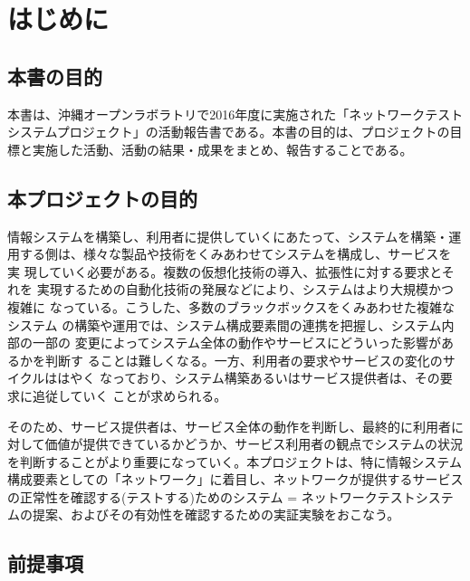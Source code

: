 
\chapter{はじめに}
\label{chap:abstract}

 \section{本書の目的}
 \label{sec:book-purpose}

本書は、沖縄オープンラボラトリで2016年度に実施された「ネットワークテスト
システムプロジェクト」の活動報告書である。本書の目的は、プロジェクトの目
標と実施した活動、活動の結果・成果をまとめ、報告することである。

 \section{本プロジェクトの目的}
 \label{sec:pj-purpose}


情報システムを構築し、利用者に提供していくにあたって、システムを構築・運
用する側は、様々な製品や技術をくみあわせてシステムを構成し、サービスを実
現していく必要がある。複数の仮想化技術の導入、拡張性に対する要求とそれを
実現するための自動化技術の発展などにより、システムはより大規模かつ複雑に
なっている。こうした、多数のブラックボックスをくみあわせた複雑なシステム
の構築や運用では、システム構成要素間の連携を把握し、システム内部の一部の
変更によってシステム全体の動作やサービスにどういった影響があるかを判断す
ることは難しくなる。一方、利用者の要求やサービスの変化のサイクルははやく
なっており、システム構築あるいはサービス提供者は、その要求に追従していく
ことが求められる。

そのため、サービス提供者は、サービス全体の動作を判断し、最終的に利用者に
対して価値が提供できているかどうか、サービス利用者の観点でシステムの状況
を判断することがより重要になっていく。本プロジェクトは、特に情報システム
構成要素としての「ネットワーク」に着目し、ネットワークが提供するサービス
の正常性を確認する(テストする)ためのシステム = ネットワークテストシステ
ムの提案、およびその有効性を確認するための実証実験をおこなう。

 \section{前提事項}
 \label{sec:premise}

